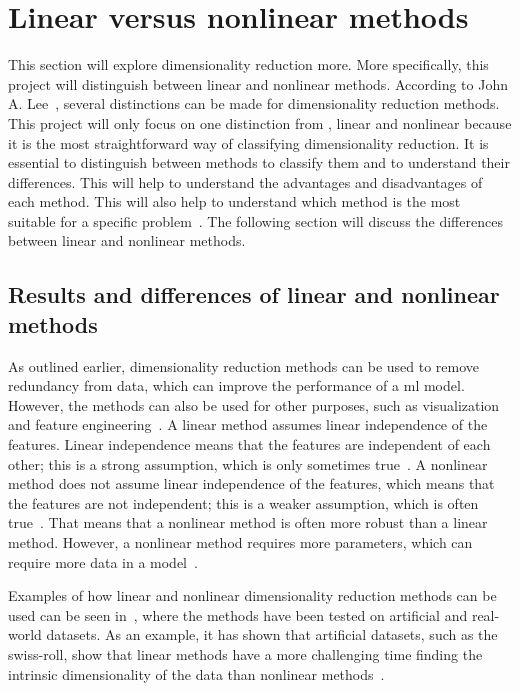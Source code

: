 \section{Linear versus nonlinear methods}\label{sec:linear-vs-nonlinear} 

This section will explore dimensionality reduction more. More specifically, this project will distinguish between linear and nonlinear methods. According to John A. Lee~\cite{nonlinear-dim-red-chapter-two}, several distinctions can be made for dimensionality reduction methods. This project will only focus on one distinction from \cite{nonlinear-dim-red-chapter-two}, linear and nonlinear because it is the most straightforward way of classifying dimensionality reduction. It is essential to distinguish between methods to classify them and to understand their differences. This will help to understand the advantages and disadvantages of each method. This will also help to understand which method is the most suitable for a specific problem~\cite{nonlinear-dim-red-chapter-two}. The following section will discuss the differences between linear and nonlinear methods. 


\subsection{Results and differences of linear and nonlinear methods}

As outlined earlier, dimensionality reduction methods can be used to remove redundancy from data, which can improve the performance of a \gls{ml} model. However, the methods can also be used for other purposes, such as visualization and feature engineering~\cite{nonlinear-dim-red-chapter-two}.
A linear method assumes linear independence of the features. Linear independence means that the features are independent of each other; this is a strong assumption, which is only sometimes true~\cite{linear-algebra-margalit}. A nonlinear method does not assume linear independence of the features, which means that the features are not independent; this is a weaker assumption, which is often true~\cite{avriel2003nonlinear}. That means that a nonlinear method is often more robust than a linear method. However, a nonlinear method requires more parameters, which can require more data in a model~\cite{nonlinear-dim-red-chapter-two}.

Examples of how linear and nonlinear dimensionality reduction methods can be used can be seen in~\cite{dimensionality-reduction-comparative-review, tennenbaum}, where the methods have been tested on artificial and real-world datasets. As an example, it has shown that artificial datasets, such as the swiss-roll, show that linear methods have a more challenging time finding the intrinsic dimensionality of the data than nonlinear methods~\cite{tennenbaum}.

